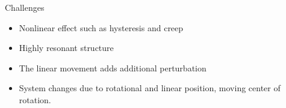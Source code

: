 \documentclass[10pt]{beamer}
\begin{document}
\begin{frame}[fragile]{Challenges}
  \begin{itemize}
    \item Nonlinear effect such as hysteresis and creep
    \item Highly resonant structure
    \item The linear movement adds additional perturbation
    \item System changes due to rotational and linear position, moving center of rotation.
  \end{itemize}
  \vspace{-0.7cm}
  \begin{figure}[h]
    \centering %
    \qquad
  \end{figure}
\end{frame}
\end{document}
